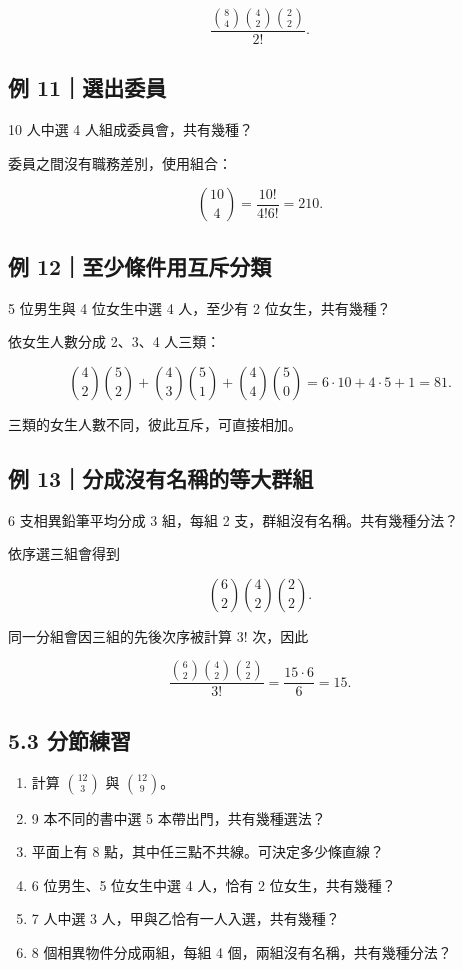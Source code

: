 \documentclass[11pt,a4paper]{article}
\providecommand{\tightlist}{%
  \setlength{\itemsep}{0pt}\setlength{\parskip}{0pt}}
\begin{document}
\[
\frac{\binom84\binom42\binom22}{2!}.
\]

\subsection{例 11｜選出委員}\label{ux4f8b-11ux9078ux51faux59d4ux54e1}

10 人中選 4 人組成委員會，共有幾種？

委員之間沒有職務差別，使用組合：

\[
\binom{10}{4}=\frac{10!}{4!6!}=210.
\]

\subsection{例 12｜至少條件用互斥分類}\label{ux4f8b-12ux81f3ux5c11ux689dux4ef6ux7528ux4e92ux65a5ux5206ux985e}

5 位男生與 4 位女生中選 4 人，至少有 2 位女生，共有幾種？

依女生人數分成 2、3、4 人三類：

\[
\binom42\binom52+\binom43\binom51+\binom44\binom50
=6\cdot10+4\cdot5+1=81.
\]

三類的女生人數不同，彼此互斥，可直接相加。

\subsection{例 13｜分成沒有名稱的等大群組}\label{ux4f8b-13ux5206ux6210ux6c92ux6709ux540dux7a31ux7684ux7b49ux5927ux7fa4ux7d44}

6 支相異鉛筆平均分成 3 組，每組 2 支，群組沒有名稱。共有幾種分法？

依序選三組會得到

\[
\binom62\binom42\binom22.
\]

同一分組會因三組的先後次序被計算 \(3!\) 次，因此

\[
\frac{\binom62\binom42\binom22}{3!}
=\frac{15\cdot6}{6}=15.
\]

\subsection{5.3 分節練習}\label{ux5206ux7bc0ux7df4ux7fd2-4}

\begin{enumerate}
\def\labelenumi{\arabic{enumi}.}
\tightlist
\item
  計算 \(\binom{12}{3}\) 與 \(\binom{12}{9}\)。
\item
  9 本不同的書中選 5 本帶出門，共有幾種選法？
\item
  平面上有 8 點，其中任三點不共線。可決定多少條直線？
\item
  6 位男生、5 位女生中選 4 人，恰有 2 位女生，共有幾種？
\item
  7 人中選 3 人，甲與乙恰有一人入選，共有幾種？
\item
  8 個相異物件分成兩組，每組 4 個，兩組沒有名稱，共有幾種分法？
\end{enumerate}
\end{document}
